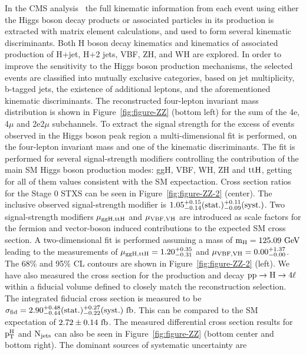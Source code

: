 \documentclass[10pt]{article}
\begin{document}
In the CMS analysis~\cite{CMS:2017jkd} the full kinematic information from each
event using either
the Higgs boson decay products or associated particles in its production is
extracted with matrix element calculations, and used to form several kinematic
discriminants. Both H boson decay kinematics and kinematics of associated
production of H+jet, H+2 jets, VBF, ZH, and WH are explored. In order to improve
the sensitivity to the Higgs boson production mechanisms, the selected events
are classified into mutually exclusive categories, based on jet multiplicity,
b-tagged jets, the existence of additional leptons, and the aforementioned
kinematic discriminants. The reconstructed four-lepton invariant mass distribution
is shown in Figure~\ref{fig:figure-ZZ} (bottom left) for the sum of the 4e,
4$\mu$ and 2e2$\mu$ subchannels. To extract the signal strength for the excess
of events observed in the Higgs boson peak region a multi-dimensional fit
is performed, on the four-lepton invariant mass and one of the kinematic
discriminants. The fit is performed for several signal-strength modifiers
controlling the contribution of the main SM Higgs boson production modes: ggH,
VBF, WH, ZH and ${\rm ttH}$, getting for all of them values consistent
with the SM expectaction. Cross section ratios for the Stage 0 STXS can be seen
in Figure~\ref{fig:figure-ZZ-2} (center). The inclusive observed signal-strength
modifier is ${\rm 1.05_{-0.14}^{+0.15}(stat.)_{-0.09}^{+0.11}(syst.)}$.
Two signal-strength modifiers ${\rm \mu_{ggH,ttH}}$ and ${\rm \mu_{VBF,VH}}$ are
introduced as scale factors for the fermion and vector-boson induced contributions
to the expected SM cross section. A two-dimensional fit is performed assuming a
mass of ${\rm m_H = 125.09~GeV}$ leading to the measurements of
${\rm \mu_{ggH,ttH} = 1.20_{-0.31}^{+0.35}}$ and
${\rm \mu_{VBF,VH} = 0.00_{-0.00}^{+1.37}}$. The 68\% and 95\% CL contours are
shown in Figure~\ref{fig:figure-ZZ-2} (left). We have also
measured the cross section for the production and decay ${\rm pp \to H \to 4\ell}$
within a fiducial volume defined to closely match the reconstruction selection.
The integrated fiducial cross section is measured to be
${\rm \sigma_{fid} = 2.90_{-0.44}^{+0.48}(stat.)_{-0.22}^{+0.27}(syst.)~fb}$.
This can be compared to the SM expectation of
${\rm 2.72 \pm 0.14~fb}$. The measured differential cross section results for
${\rm p_{T}^{H}}$ and ${\rm N_{jets}}$ can also be seen in Figure~\ref{fig:figure-ZZ}
(bottom center and bottom right). The dominant sources of systematic uncertainty are
\end{document}
